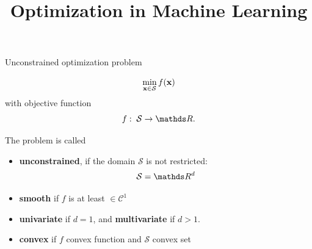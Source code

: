 \documentclass[11pt,compress,t,notes=noshow, xcolor=table]{beamer}
\title{Optimization in Machine Learning}
\date{}
\begin{document}
\sloppy

\begin{vbframe}{Unconstrained optimization problem}

$$
\min_{\mathbf{x} \in \mathcal{S}} f(\mathbf{x})
$$
with objective function
$$
f: \; \mathcal{S} \to \R.
$$

\lz 

The problem is called
 
\begin{itemize}
	\item \textbf{unconstrained}, if the domain $\mathcal{S}$ is not restricted: 
	$$
		\mathcal{S} = \R^d
	$$
	\item \textbf{smooth} if $f$ is at least $\in \mathcal{C}^1$
	\item \textbf{univariate} if $d = 1$, and \textbf{multivariate} if $d > 1$.  
	\item \textbf{convex} if $f$ convex function and $\mathcal{S}$ convex set
\end{itemize}

\end{vbframe}


	

\end{document}
